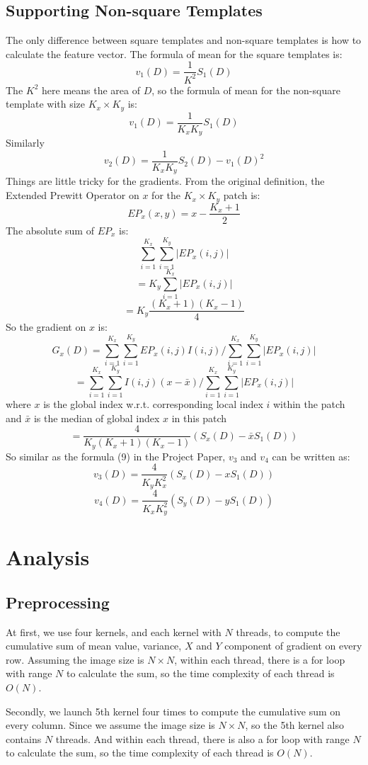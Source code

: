 \documentclass[12pt, a4paper]{article}
\begin{document}
  \subsection{Supporting Non-square Templates}\label{non-square}
    The only difference between square templates and non-square templates is how
    to calculate the feature vector. The formula of mean for the square templates
    is:
    \[v_1(D)=\frac{1}{K^2}S_1(D)\]
    The $K^2$ here means the area of $D$, so the formula of mean for the non-square
    template with size $K_x\times K_y$ is:
    \[v_1(D)=\frac{1}{K_xK_y}S_1(D)\]
    Similarly
    \[v_2(D)=\frac{1}{K_xK_y}S_2(D)-v_1(D)^2\]
    Things are little tricky for the gradients. From the original definition,
    the Extended Prewitt Operator on $x$ for the $K_x\times K_y$ patch is:
    \[EP_x(x, y)=x-\frac{K_x+1}{2}\]
    The absolute sum of $EP_x$ is:
    \[\sum_{i=1}^{K_x}\sum_{i=1}^{K_y}\left|EP_x(i,j)\right|\]
    \[=K_y\sum_{i=1}^{K_x}\left|EP_x(i,j)\right|\]
    \[=K_y\frac{(K_x+1)(K_x-1)}{4}\]
    So the gradient on $x$ is:
    \[G_x(D)=\sum_{i=1}^{K_x}\sum_{i=1}^{K_y}EP_x(i,j)I(i,j)/
      \sum_{i=1}^{K_x}\sum_{i=1}^{K_y}\left|EP_x(i,j)\right|\]
    \[=\sum_{i=1}^{K_x}\sum_{i=1}^{K_y}I(i,j)(x-\bar{x})/
      \sum_{i=1}^{K_x}\sum_{i=1}^{K_y}\left|EP_x(i,j)\right|\]
    where $x$ is the global index w.r.t. corresponding local index $i$ within the
    patch and $\bar{x}$ is the median of global index $x$ in this patch
    \[=\frac{4}{K_y(K_x+1)(K_x-1)}(S_x(D)-\bar{x}S_1(D))\]
    So similar as the formula (9) in the Project Paper, $v_3$ and $v_4$ can be
    written as:
    \[v_3(D)=\frac{4}{K_yK_x^2}(S_x(D)-xS_1(D))\]
    \[v_4(D)=\frac{4}{K_xK_y^2}(S_y(D)-yS_1(D))\]

\section{Analysis}
  \subsection{Preprocessing}
    At first, we use four kernels, and each kernel with $N$ threads, to compute the
    cumulative sum of mean value, variance, $X$ and $Y$ component of gradient on
    every row. Assuming the image size is $N \times N$, within each thread, there is
    a for loop with range $N$ to calculate the sum, so the time complexity of
    each thread is $O(N)$.

    Secondly, we launch 5th kernel four times to compute the cumulative sum on every column.
    Since we assume the image size is $N \times N$, so the 5th kernel also contains
    $N$ threads. And within each thread, there is also a for loop with range $N$ to
    calculate the sum, so the time complexity of each thread is $O(N)$.
\end{document}
